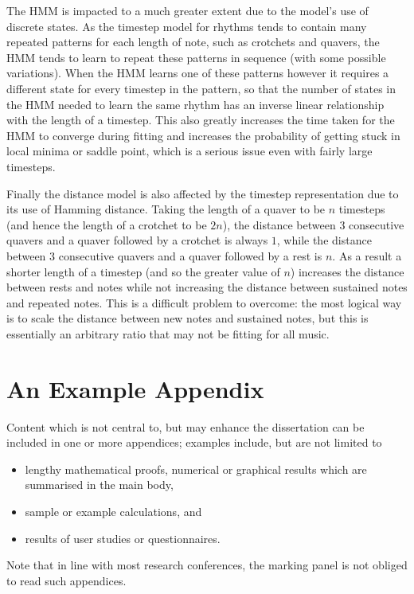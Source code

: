 \documentclass[ author={Stephen Livermore-Tozer},
				supervisor={Dr. Peter Flach},
				degree={MEng},
				title={Performing Algorithmic Co-composition Using Machine Learning},
				subtitle={},
				type={research},
				year={2016} ]{dissertation}
\begin{document}
	The HMM is impacted to a much greater extent due to the model's use of discrete states. As the timestep model for rhythms tends to contain many repeated patterns for each length of note, such as crotchets and quavers, the HMM tends to learn to repeat these patterns in sequence (with some possible variations). When the HMM learns one of these patterns however it requires a different state for every timestep in the pattern, so that the number of states in the HMM needed to learn the same rhythm has an inverse linear relationship with the length of a timestep. This also greatly increases the time taken for the HMM to converge during fitting and increases the probability of getting stuck in local minima or saddle point, which is a serious issue even with fairly large timesteps. 
	
	Finally the distance model is also affected by the timestep representation due to its use of Hamming distance. Taking the length of a quaver to be $n$ timesteps (and hence the length of a crotchet to be $2n$), the distance between 3 consecutive quavers and a quaver followed by a crotchet is always $1$, while the distance between 3 consecutive quavers and a quaver followed by a rest is $n$. As a result a shorter length of a timestep (and so the greater value of $n$) increases the distance between rests and notes while not increasing the distance between sustained notes and repeated notes. This is a difficult problem to overcome: the most logical way is to scale the distance between new notes and sustained notes, but this is essentially an arbitrary ratio that may not be fitting for all music. 

	\backmatter
	
	
	
	\appendix
	
	\chapter{An Example Appendix}
	\label{appx:example}
	
	Content which is not central to, but may enhance the dissertation can be 
	included in one or more appendices; examples include, but are not limited
	to
	
	\begin{itemize}
		\item lengthy mathematical proofs, numerical or graphical results which 
		are summarised in the main body,
		\item sample or example calculations, 
		and
		\item results of user studies or questionnaires.
	\end{itemize}
	
	\noindent
	Note that in line with most research conferences, the marking panel is not
	obliged to read such appendices.
	
	
\end{document}
